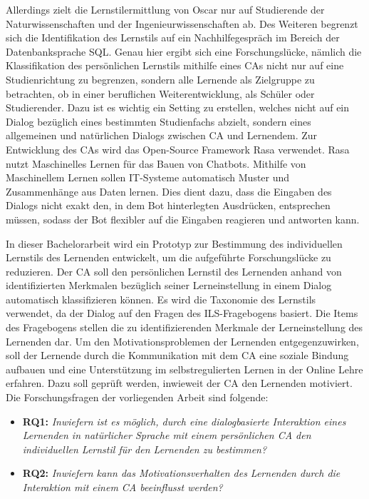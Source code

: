 Allerdings zielt die Lernstilermittlung von Oscar nur auf Studierende der Naturwissenschaften 
und der Ingenieurwissenschaften ab. Des Weiteren begrenzt sich die Identifikation des Lernstils auf ein Nachhilfegespräch
im Bereich der Datenbanksprache SQL. 
Genau hier ergibt sich eine Forschungslücke,
nämlich die Klassifikation des persönlichen Lernstils mithilfe eines CAs nicht nur auf eine Studienrichtung zu begrenzen,
sondern alle Lernende als Zielgruppe zu betrachten, ob in einer beruflichen Weiterentwicklung, 
als Schüler oder Studierender. Dazu ist es wichtig ein Setting zu erstellen,
welches nicht auf ein Dialog bezüglich eines bestimmten Studienfachs abzielt,
sondern eines allgemeinen und natürlichen Dialogs zwischen CA und Lernendem.
Zur Entwicklung des CAs wird das Open-Source Framework Rasa verwendet. Rasa nutzt 
Maschinelles Lernen für das Bauen von Chatbots. \parencite[25]{Kong.2021} 
Mithilfe von Maschinellem Lernen sollen IT-Systeme automatisch Muster und 
Zusammenhänge aus Daten lernen. \parencite[35]{deru.2020} 
Dies dient dazu, dass die Eingaben des Dialogs nicht exakt den, in dem Bot hinterlegten Ausdrücken, 
entsprechen müssen, sodass der Bot flexibler auf die Eingaben reagieren und antworten kann. \parencite[142]{Sieber.2019}

In dieser Bachelorarbeit wird ein Prototyp zur Bestimmung des individuellen Lernstils des Lernenden 
entwickelt, um die aufgeführte Forschungslücke zu reduzieren.
Der CA soll den persönlichen Lernstil des Lernenden anhand von identifizierten Merkmalen bezüglich seiner Lerneinstellung 
in einem Dialog automatisch klassifizieren können. Es wird die Taxonomie des Lernstils verwendet, da 
der Dialog auf den Fragen des ILS-Fragebogens basiert.
Die Items des Fragebogens stellen die zu identifizierenden Merkmale der Lerneinstellung des Lernenden dar.
Um den Motivationsproblemen der Lernenden entgegenzuwirken,
soll der Lernende durch die Kommunikation mit dem CA eine soziale Bindung aufbauen 
und eine Unterstützung im selbstregulierten Lernen in der Online Lehre erfahren.
Dazu soll geprüft werden, inwieweit der CA den Lernenden motiviert. 
Die Forschungsfragen der vorliegenden Arbeit sind folgende:

\begin{itemize}                 
    \item \textbf{RQ1:} \textit{\glqq Inwiefern ist es möglich, durch eine dialogbasierte Interaktion eines Lernenden in natürlicher Sprache mit einem persönlichen CA den individuellen Lernstil für den Lernenden zu bestimmen?\grqq{} }
    \item \textbf{RQ2:} \textit{\glqq Inwiefern kann das Motivationsverhalten des Lernenden durch die Interaktion mit einem CA beeinflusst werden?\grqq{} }
\end{itemize}


